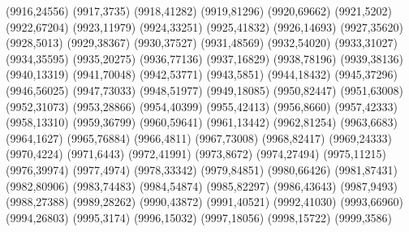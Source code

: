 (9916,24556)
(9917,3735)
(9918,41282)
(9919,81296)
(9920,69662)
(9921,5202)
(9922,67204)
(9923,11979)
(9924,33251)
(9925,41832)
(9926,14693)
(9927,35620)
(9928,5013)
(9929,38367)
(9930,37527)
(9931,48569)
(9932,54020)
(9933,31027)
(9934,35595)
(9935,20275)
(9936,77136)
(9937,16829)
(9938,78196)
(9939,38136)
(9940,13319)
(9941,70048)
(9942,53771)
(9943,5851)
(9944,18432)
(9945,37296)
(9946,56025)
(9947,73033)
(9948,51977)
(9949,18085)
(9950,82447)
(9951,63008)
(9952,31073)
(9953,28866)
(9954,40399)
(9955,42413)
(9956,8660)
(9957,42333)
(9958,13310)
(9959,36799)
(9960,59641)
(9961,13442)
(9962,81254)
(9963,6683)
(9964,1627)
(9965,76884)
(9966,4811)
(9967,73008)
(9968,82417)
(9969,24333)
(9970,4224)
(9971,6443)
(9972,41991)
(9973,8672)
(9974,27494)
(9975,11215)
(9976,39974)
(9977,4974)
(9978,33342)
(9979,84851)
(9980,66426)
(9981,87431)
(9982,80906)
(9983,74483)
(9984,54874)
(9985,82297)
(9986,43643)
(9987,9493)
(9988,27388)
(9989,28262)
(9990,43872)
(9991,40521)
(9992,41030)
(9993,66960)
(9994,26803)
(9995,3174)
(9996,15032)
(9997,18056)
(9998,15722)
(9999,3586)
